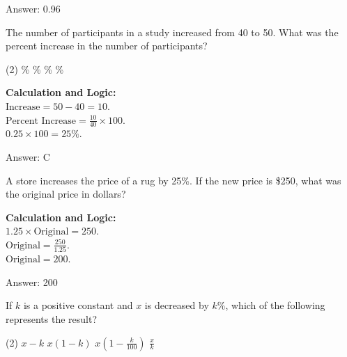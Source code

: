 \documentclass[11pt,paper=a4,answers]{exam}
\begin{document}
\begin{questions}
\begin{solution}
\vspace{30pt}

Answer: \colorbox{yellow!100}{0.96}
\end{solution}

\vspace{60pt}

\question
The number of participants in a study increased from 40 to 50. What was the percent increase in the number of participants?
\begin{tasks}(2)
    \%
    \%
    \%
    \%
\end{tasks}

\begin{solution}
\textbf{Calculation and Logic:} \\
$\text{Increase} = 50 - 40 = 10$. \\
$\text{Percent Increase} = \frac{10}{40} \times 100$. \\
$0.25 \times 100 = 25\%$.

\vspace{30pt}

Answer: \colorbox{yellow!100}{C}
\end{solution}

\vspace{60pt}

\question
A store increases the price of a rug by 25\%. If the new price is \$250, what was the original price in dollars?

\begin{solution}
\textbf{Calculation and Logic:} \\
$1.25 \times \text{Original} = 250$. \\
$\text{Original} = \frac{250}{1.25}$. \\
$\text{Original} = 200$.

\vspace{30pt}

Answer: \colorbox{yellow!100}{200}
\end{solution}

\vspace{60pt}

\question
If $k$ is a positive constant and $x$ is decreased by $k$\%, which of the following represents the result?
\begin{tasks}(2)
    \task $x - k$
    \task $x(1 - k)$
    \task $x(1 - \frac{k}{100})$
    \task $\frac{x}{k}$
\end{tasks}


\end{questions}
\end{document}
